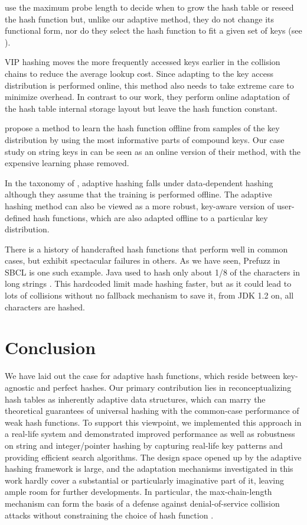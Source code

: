 \documentclass[sigconf]{acmart}
\begin{document}
 use the maximum probe length to decide when to grow the hash table or reseed the hash function but, unlike our adaptive method, they do not change its functional form, nor do they select the hash function to fit a given set of keys (see ).

VIP hashing \citep{kakaraparthy2022vip} moves the more frequently accessed keys earlier in the collision chains to reduce the average lookup cost.
Since adapting to the key access distribution is performed online, this method also needs to take extreme care to minimize overhead.
In contrast to our work, they perform online adaptation of the hash table internal storage layout but leave the hash function constant.

 propose a method to learn the hash function offline from samples of the key distribution by using the most informative parts of compound keys.
Our case study on string keys in  can be seen as an online version of their method, with the expensive learning phase removed.

In the taxonomy of \citet{chi2017hashing}, adaptive hashing falls under data-dependent hashing although they assume that the training is performed offline.
The adaptive hashing method can also be viewed as a more robust, key-aware version of user-defined hash functions, which are also adapted offline to a particular key distribution.

There is a history of handcrafted hash functions that perform well in common cases, but exhibit spectacular failures in others.
As we have seen, Prefuzz in SBCL is one such example.
Java used to hash only about 1/8 of the characters in long strings \citep{jdkstringhashsubsampling}.
This hardcoded limit made hashing faster, but as it could lead to lots of collisions without no fallback mechanism to save it, from JDK 1.2 on, all characters are hashed.


\section{Conclusion}

We have laid out the case for adaptive hash functions, which reside between key-agnostic and perfect hashes.
Our primary contribution lies in reconceptualizing hash tables as inherently adaptive data structures, which can marry the theoretical guarantees of universal hashing with the common-case performance of weak hash functions.
To support this viewpoint, we implemented this approach in a real-life system and demonstrated improved performance as well as robustness on string and integer/pointer hashing by capturing real-life key patterns and providing efficient search algorithms.
The design space opened up by the adaptive hashing framework is large, and the adaptation mechanisms investigated in this work hardly cover a substantial or particularly imaginative part of it, leaving ample room for further developments.
In particular, the max-chain-length mechanism can form the basis of a defense against denial-of-service collision attacks without constraining the choice of hash function \citep{aumasson2012siphash}.
\end{document}
